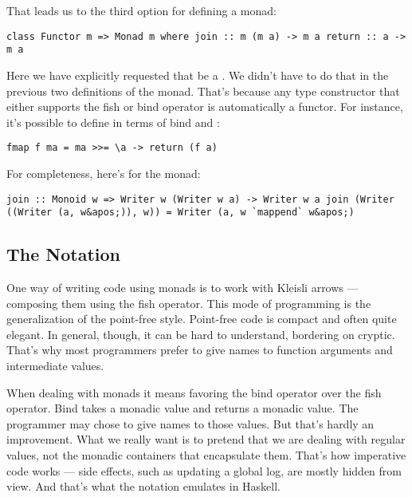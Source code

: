 That leads us to the third option for defining a monad:

\begin{verbatim}
class Functor m => Monad m where join :: m (m a) -> m a return :: a -> m a
\end{verbatim}

Here we have explicitly requested that  be a .
We didn't have to do that in the previous two definitions of the monad.
That's because any type constructor  that either supports the
fish or bind operator is automatically a functor. For instance, it's
possible to define  in terms of bind and :

\begin{verbatim}
fmap f ma = ma >>= \a -> return (f a)
\end{verbatim}

For completeness, here's  for the  monad:

\begin{verbatim}
join :: Monoid w => Writer w (Writer w a) -> Writer w a join (Writer ((Writer (a, w&apos;)), w)) = Writer (a, w `mappend` w&apos;)
\end{verbatim}

\subsection{\texorpdfstring{The 
Notation}{The do Notation}}\label{the-do-notation}

One way of writing code using monads is to work with Kleisli arrows ---
composing them using the fish operator. This mode of programming is the
generalization of the point-free style. Point-free code is compact and
often quite elegant. In general, though, it can be hard to understand,
bordering on cryptic. That's why most programmers prefer to give names
to function arguments and intermediate values.

When dealing with monads it means favoring the bind operator over the
fish operator. Bind takes a monadic value and returns a monadic value.
The programmer may chose to give names to those values. But that's
hardly an improvement. What we really want is to pretend that we are
dealing with regular values, not the monadic containers that encapsulate
them. That's how imperative code works --- side effects, such as
updating a global log, are mostly hidden from view. And that's what the
 notation emulates in Haskell.


